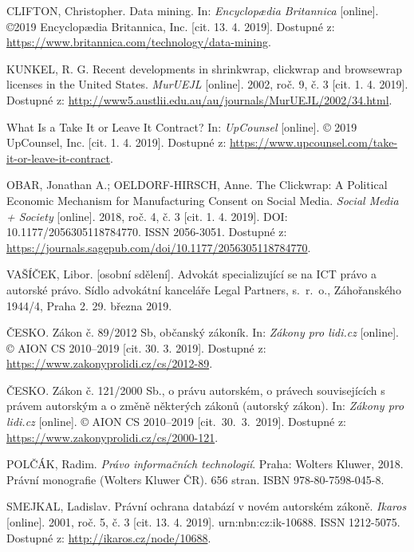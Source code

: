 \documentclass[thesis=B,czech]{FITthesis}[2012/06/26]
\begin{document}
\begin{thebibliography}{99}
	CLIFTON, Christopher. Data mining. In: \textit{Encyclopædia Britannica} [online]. ©2019 Encyclopædia Britannica, Inc. [cit. 13. 4. 2019]. Dostupné z: \url{https://www.britannica.com/technology/data-mining}.
	
	KUNKEL, R. G. Recent developments in shrinkwrap, clickwrap and browsewrap licenses in the United States. \textit{MurUEJL} [online]. 2002, roč. 9, č. 3 [cit. 1. 4. 2019]. Dostupné z: \url{http://www5.austlii.edu.au/au/journals/MurUEJL/2002/34.html}.
	
	What Is a Take It or Leave It Contract? In: \textit{UpCounsel} [online]. © 2019 UpCounsel, Inc. [cit. 1. 4. 2019]. Dostupné z: \url{https://www.upcounsel.com/take-it-or-leave-it-contract}.
	
	OBAR, Jonathan A.; OELDORF-HIRSCH, Anne. The Clickwrap: A Political Economic Mechanism for Manufacturing Consent on Social Media. \textit{Social Media + Society} [online]. 2018, roč. 4, č. 3 [cit. 1. 4. 2019]. DOI: 10.1177/2056305118784770. ISSN 2056-3051. Dostupné z: \url{https://journals.sagepub.com/doi/10.1177/2056305118784770}.
	
	VAŠÍČEK, Libor. [osobní sdělení]. Advokát specializující se na ICT právo a autorské právo. Sídlo advokátní kanceláře Legal Partners, s.~r.~o., Záhořanského 1944/4, Praha 2. 29. března 2019.
	
	ČESKO. Zákon č. 89/2012 Sb, občanský zákoník. In: \textit{Zákony pro lidi.cz} [online]. © AION CS 2010--2019 [cit. 30. 3. 2019]. Dostupné z: \url{https://www.zakonyprolidi.cz/cs/2012-89}.
	
	ČESKO. Zákon č. 121/2000 Sb., o právu autorském, o právech souvisejících s právem autorským a o změně některých zákonů (autorský zákon). In: \textit{Zákony pro lidi.cz} [online]. © AION CS 2010--2019 [cit.~30.~3.~2019]. Dostupné z: \url{https://www.zakonyprolidi.cz/cs/2000-121}.
	
	POLČÁK, Radim. \textit{Právo informačních technologií}. Praha: Wolters Kluwer, 2018. Právní monografie (Wolters Kluwer ČR). 656 stran. ISBN 978-80-7598-045-8.
	
	SMEJKAL, Ladislav. Právní ochrana databází v novém autorském zákoně. \textit{Ikaros} [online]. 2001, roč. 5, č. 3 [cit. 13. 4. 2019]. urn:nbn:cz:ik-10688. ISSN 1212-5075. Dostupné z: \url{http://ikaros.cz/node/10688}.
	

\end{thebibliography}
\end{document}
